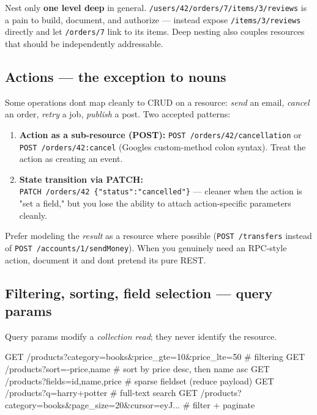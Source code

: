 \documentclass[11pt]{article}
\providecommand{\tightlist}{\setlength{\itemsep}{1pt}\setlength{\parskip}{0pt}}
\newenvironment{Shaded}{\begin{snugshade}}{\end{snugshade}}
\newcommand{\NormalTok}[1]{\textcolor[rgb]{0.81,0.81,0.76}{#1}}
\begin{document}
Nest only \textbf{one level deep} in general. \texttt{/users/42/orders/7/items/3/reviews} is a pain to build, document, and authorize --- instead expose \texttt{/items/3/reviews} directly and let \texttt{/orders/7} link to its items. Deep nesting also couples resources that should be independently addressable.

\subsection{Actions --- the exception to nouns}\label{actions--the-exception-to-nouns}

Some operations don\textquotesingle t map cleanly to CRUD on a resource: \emph{send} an email, \emph{cancel} an order, \emph{retry} a job, \emph{publish} a post. Two accepted patterns:

\begin{enumerate}
\def\labelenumi{\arabic{enumi}.}
\tightlist
\item
  \textbf{Action as a sub-resource (POST):} \texttt{POST\ /orders/42/cancellation} or \texttt{POST\ /orders/42:cancel} (Google\textquotesingle s custom-method colon syntax). Treat the action as creating an event.
\item
  \textbf{State transition via PATCH:} \texttt{PATCH\ /orders/42\ \{"status":"cancelled"\}} --- cleaner when the action is "set a field," but you lose the ability to attach action-specific parameters cleanly.
\end{enumerate}

Prefer modeling the \emph{result} as a resource where possible (\texttt{POST\ /transfers} instead of \texttt{POST\ /accounts/1/sendMoney}). When you genuinely need an RPC-style action, document it and don\textquotesingle t pretend it\textquotesingle s pure REST.

\subsection{Filtering, sorting, field selection --- query params}\label{filtering-sorting-field-selection--query-params}

Query params modify a \emph{collection read}; they never identify the resource.


\begin{Shaded}
\begin{Highlighting}[]
\NormalTok{GET /products?category=books\&price\_gte=10\&price\_lte=50      \# filtering}
\NormalTok{GET /products?sort={-}price,name                               \# sort by price desc, then name asc}
\NormalTok{GET /products?fields=id,name,price                           \# sparse fieldset (reduce payload)}
\NormalTok{GET /products?q=harry+potter                                 \# full{-}text search}
\NormalTok{GET /products?category=books\&page\_size=20\&cursor=eyJ...      \# filter + paginate}
\end{Highlighting}
\end{Shaded}
\end{document}
